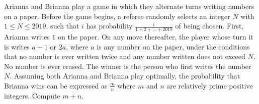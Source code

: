 Arianna and Brianna play a game in which they alternate turns writing numbers on a paper. Before the game begins, a referee randomly selects an integer $N$ with $1 \leq N \leq 2019$, such that $i$ has probability $\frac{i}{1 + 2 + \dots + 2019}$ of being chosen. First, Arianna writes $1$ on the paper. On any move thereafter, the player whose turn it is writes $a+1$ or $2a$, where $a$ is any number on the paper, under the conditions that no number is ever written twice and any number written does not exceed $N$. No number is ever erased. The winner is the person who first writes the number $N$. Assuming both Arianna and Brianna play optimally, the probability that Brianna wins can be expressed as $\frac{m}{n}$ where $m$ and $n$ are relatively prime positive integers. Compute $m + n.$
